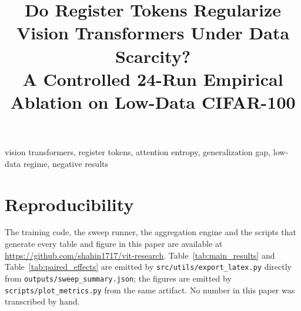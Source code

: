 \documentclass[conference]{IEEEtran}
\begin{document}

\title{Do Register Tokens Regularize Vision Transformers Under Data Scarcity?\\
A Controlled 24-Run Empirical Ablation on Low-Data CIFAR-100}

\author{
}

\maketitle



\begin{IEEEkeywords}
vision transformers, register tokens, attention entropy, generalization gap, low-data regime, negative results
\end{IEEEkeywords}










\section*{Reproducibility}
The training code, the sweep runner, the aggregation engine and the scripts that
generate every table and figure in this paper are available at
\url{https://github.com/shahin1717/vit-research}. Table~\ref{tab:main_results}
and Table~\ref{tab:paired_effects} are emitted by
\texttt{src/utils/export\_latex.py} directly from
\texttt{outputs/sweep\_summary.json}; the figures are emitted by
\texttt{scripts/plot\_metrics.py} from the same artifact. No number in this
paper was transcribed by hand.



\end{document}
